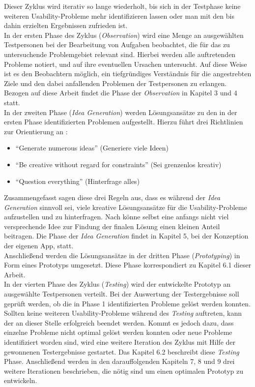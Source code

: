 \noindent
Dieser Zyklus wird iterativ so lange wiederholt, bis sich in der Testphase keine weiteren Usability-Probleme mehr identifizieren lassen oder man mit den bis dahin erzielten Ergebnissen zufrieden ist. \\

In der ersten Phase des Zyklus (\emph{Observation}) wird eine Menge an ausgewählten Testpersonen bei der Bearbeitung von Aufgaben beobachtet, die für das zu untersuchende Problemgebiet relevant sind.
Hierbei werden alle auftretenden Probleme notiert, und auf ihre eventuellen Ursachen untersucht.
Auf diese Weise ist es den Beobachtern möglich, ein tiefgründiges Verständnis für die angestrebten Ziele und den dabei anfallenden Problemen der Testpersonen zu erlangen.
Bezogen auf diese Arbeit findet die Phase der \emph{Observation} in Kapitel 3 und 4 statt. \\

In der zweiten Phase (\emph{Idea Generation}) werden Lösungsansätze zu den in der ersten Phase identifizierten Problemen aufgestellt.
Hierzu führt \citeauthor{Norman13} drei Richtlinien zur Orientierung an \citep[Seite 226]{Norman13}:

\begin{itemize}
	\item ``Generate numerous ideas'' (Generiere viele Ideen)
	\item ``Be creative without regard for constraints'' (Sei grenzenlos kreativ)
	\item ``Question everything'' (Hinterfrage alles)
\end{itemize}

\noindent
Zusammengefasst sagen diese drei Regeln aus, dass es während der \emph{Idea Generation} sinnvoll sei, viele kreative Lösungsansätze für die Usability-Probleme aufzustellen und zu hinterfragen.
Nach \citeauthor{Norman13} könne selbst eine anfangs nicht viel versprechende Idee zur Findung der finalen Lösung einen kleinen Anteil beitragen.
Die Phase der \emph{Idea Generation} findet in Kapitel 5, bei der Konzeption der eigenen App, statt. \\

Anschließend werden die Lösungsansätze in der dritten Phase (\emph{Prototyping}) in Form eines Prototyps umgesetzt.
Diese Phase korrespondiert zu Kapitel 6.1 dieser Arbeit. \\

In der vierten Phase des Zyklus (\emph{Testing}) wird der entwickelte Prototyp an ausgewählte Testpersonen verteilt.
Bei der Auswertung der Testergebnisse soll geprüft werden, ob die in Phase 1 identifizierten Probleme gelöst werden konnten.
Sollten keine weiteren Usability-Probleme während des \emph{Testing} auftreten, kann der \hcdp{} an dieser Stelle erfolgreich beendet werden.
Kommt es jedoch dazu, dass einzelne Probleme nicht optimal gelöst werden konnten oder neue Probleme identifiziert worden sind, wird eine weitere Iteration des Zyklus mit Hilfe der gewonnenen Testergebnisse gestartet.
Das Kapitel 6.2 beschreibt diese \emph{Testing} Phase.
Anschließend werden in den darauffolgenden Kapiteln 7, 8 und 9 drei weitere Iterationen beschrieben, die nötig sind um einen optimalen Prototyp zu entwickeln.
